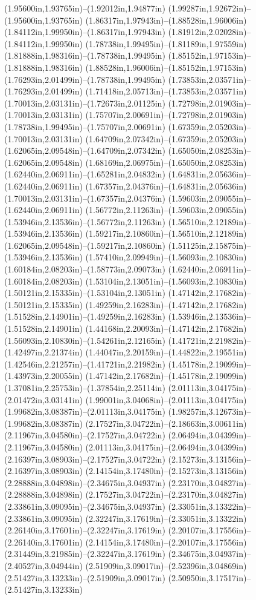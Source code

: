 (1.95600in,1.93765in)--(1.92012in,1.94877in) (1.99287in,1.92672in)--(1.95600in,1.93765in) (1.86317in,1.97943in)--(1.88528in,1.96006in) (1.84112in,1.99950in)--(1.86317in,1.97943in) (1.81912in,2.02028in)--(1.84112in,1.99950in) (1.78738in,1.99495in)--(1.81189in,1.97559in) (1.81888in,1.98316in)--(1.78738in,1.99495in) (1.85152in,1.97153in)--(1.81888in,1.98316in) (1.88528in,1.96006in)--(1.85152in,1.97153in) (1.76293in,2.01499in)--(1.78738in,1.99495in) (1.73853in,2.03571in)--(1.76293in,2.01499in) (1.71418in,2.05713in)--(1.73853in,2.03571in) (1.70013in,2.03131in)--(1.72673in,2.01125in) (1.72798in,2.01903in)--(1.70013in,2.03131in) (1.75707in,2.00691in)--(1.72798in,2.01903in) (1.78738in,1.99495in)--(1.75707in,2.00691in) (1.67359in,2.05203in)--(1.70013in,2.03131in) (1.64709in,2.07342in)--(1.67359in,2.05203in) (1.62065in,2.09548in)--(1.64709in,2.07342in) (1.65050in,2.08253in)--(1.62065in,2.09548in) (1.68169in,2.06975in)--(1.65050in,2.08253in) (1.62440in,2.06911in)--(1.65281in,2.04832in) (1.64831in,2.05636in)--(1.62440in,2.06911in) (1.67357in,2.04376in)--(1.64831in,2.05636in) (1.70013in,2.03131in)--(1.67357in,2.04376in) (1.59603in,2.09055in)--(1.62440in,2.06911in) (1.56772in,2.11263in)--(1.59603in,2.09055in) (1.53946in,2.13536in)--(1.56772in,2.11263in) (1.56510in,2.12189in)--(1.53946in,2.13536in) (1.59217in,2.10860in)--(1.56510in,2.12189in) (1.62065in,2.09548in)--(1.59217in,2.10860in) (1.51125in,2.15875in)--(1.53946in,2.13536in) (1.57410in,2.09949in)--(1.56093in,2.10830in) (1.60184in,2.08203in)--(1.58773in,2.09073in) (1.62440in,2.06911in)--(1.60184in,2.08203in) (1.53104in,2.13051in)--(1.56093in,2.10830in) (1.50121in,2.15335in)--(1.53104in,2.13051in) (1.47142in,2.17682in)--(1.50121in,2.15335in) (1.49259in,2.16283in)--(1.47142in,2.17682in) (1.51528in,2.14901in)--(1.49259in,2.16283in) (1.53946in,2.13536in)--(1.51528in,2.14901in) (1.44168in,2.20093in)--(1.47142in,2.17682in) (1.56093in,2.10830in)--(1.54261in,2.12165in) (1.41721in,2.21982in)--(1.42497in,2.21374in) (1.44047in,2.20159in)--(1.44822in,2.19551in) (1.42546in,2.21257in)--(1.41721in,2.21982in) (1.45178in,2.19099in)--(1.43973in,2.20055in) (1.47142in,2.17682in)--(1.45178in,2.19099in) (1.37081in,2.25753in)--(1.37854in,2.25114in) (2.01113in,3.04175in)--(2.01472in,3.03141in) (1.99001in,3.04068in)--(2.01113in,3.04175in) (1.99682in,3.08387in)--(2.01113in,3.04175in) (1.98257in,3.12673in)--(1.99682in,3.08387in) (2.17527in,3.04722in)--(2.18663in,3.00611in) (2.11967in,3.04580in)--(2.17527in,3.04722in) (2.06494in,3.04399in)--(2.11967in,3.04580in) (2.01113in,3.04175in)--(2.06494in,3.04399in) (2.16397in,3.08903in)--(2.17527in,3.04722in) (2.15273in,3.13156in)--(2.16397in,3.08903in) (2.14154in,3.17480in)--(2.15273in,3.13156in) (2.28888in,3.04898in)--(2.34675in,3.04937in) (2.23170in,3.04827in)--(2.28888in,3.04898in) (2.17527in,3.04722in)--(2.23170in,3.04827in) (2.33861in,3.09095in)--(2.34675in,3.04937in) (2.33051in,3.13322in)--(2.33861in,3.09095in) (2.32247in,3.17619in)--(2.33051in,3.13322in) (2.26140in,3.17601in)--(2.32247in,3.17619in) (2.20107in,3.17556in)--(2.26140in,3.17601in) (2.14154in,3.17480in)--(2.20107in,3.17556in) (2.31449in,3.21985in)--(2.32247in,3.17619in) (2.34675in,3.04937in)--(2.40527in,3.04944in) (2.51909in,3.09017in)--(2.52396in,3.04869in) (2.51427in,3.13233in)--(2.51909in,3.09017in) (2.50950in,3.17517in)--(2.51427in,3.13233in) 
